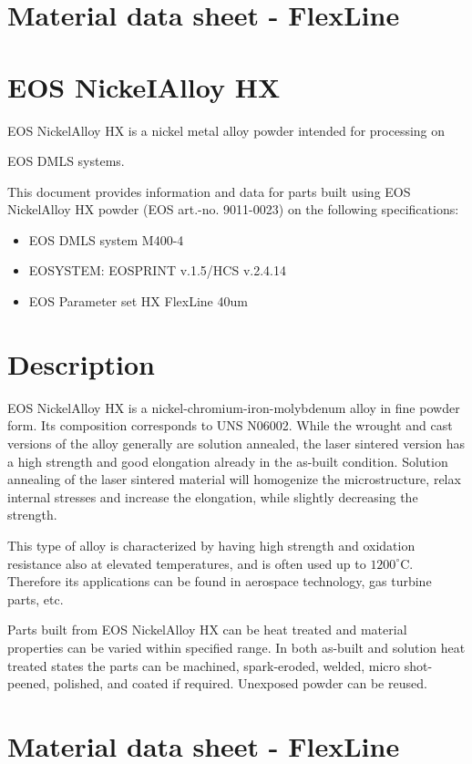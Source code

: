 \documentclass[10pt]{article}
\begin{document}
\section*{Material data sheet - FlexLine}
\section*{EOS NickeIAlloy HX}
EOS NickelAlloy HX is a nickel metal alloy powder intended for processing on

EOS DMLS systems.

This document provides information and data for parts built using EOS NickelAlloy HX powder (EOS art.-no. 9011-0023) on the following specifications:

\begin{itemize}
  \item EOS DMLS system M400-4
  \item EOSYSTEM: EOSPRINT v.1.5/HCS v.2.4.14
  \item EOS Parameter set HX FlexLine 40um
\end{itemize}

\section*{Description}
EOS NickelAlloy HX is a nickel-chromium-iron-molybdenum alloy in fine powder form. Its composition corresponds to UNS N06002. While the wrought and cast versions of the alloy generally are solution annealed, the laser sintered version has a high strength and good elongation already in the as-built condition. Solution annealing of the laser sintered material will homogenize the microstructure, relax internal stresses and increase the elongation, while slightly decreasing the strength.

This type of alloy is characterized by having high strength and oxidation resistance also at elevated temperatures, and is often used up to $1200^{\circ} \mathrm{C}$. Therefore its applications can be found in aerospace technology, gas turbine parts, etc.

Parts built from EOS NickelAlloy HX can be heat treated and material properties can be varied within specified range. In both as-built and solution heat treated states the parts can be machined, spark-eroded, welded, micro shot-peened, polished, and coated if required. Unexposed powder can be reused.

\section*{Material data sheet - FlexLine}
\end{document}
